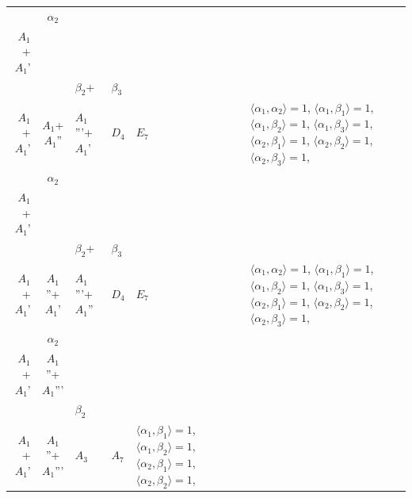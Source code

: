 \documentclass[12pt]{report}
\begin{document}
\begin{appendix}
{\begin{longtable}{rcl p{1cm}p{1cm}p{3cm} }
\\
\begin{tabular}{cc}$\alpha_1$+ & $\alpha_2$\\\tiny{ $A_1$+$A_1$' } & \tiny{  }\end{tabular} &\begin{tabular}{c} = \\~ \end{tabular} & \begin{tabular}{ccc}$\beta_1$+ & $\beta_2$+ & $\beta_3$\\\tiny{ $A_1$+$A_1$' } & \tiny{ $A_1$+$A_1$'' } & \tiny{ $A_1$'''+$A_1$' }\end{tabular} & $D_4$ & $E_7$ & $\langle\alpha_1, \alpha_2\rangle=1$,  $\langle\alpha_1, \beta_1\rangle=1$, $\langle\alpha_1, \beta_2\rangle=1$, $\langle\alpha_1, \beta_3\rangle=1$, $\langle\alpha_2, \beta_1\rangle=1$, $\langle\alpha_2, \beta_2\rangle=1$, $\langle\alpha_2, \beta_3\rangle=1$, 
\\
\begin{tabular}{cc}$\alpha_1$+ & $\alpha_2$\\\tiny{ $A_1$+$A_1$' } & \tiny{  }\end{tabular} &\begin{tabular}{c} = \\~ \end{tabular} & \begin{tabular}{ccc}$\beta_1$+ & $\beta_2$+ & $\beta_3$\\\tiny{ $A_1$+$A_1$' } & \tiny{ $A_1$''+$A_1$' } & \tiny{ $A_1$'''+$A_1$'' }\end{tabular} & $D_4$ & $E_7$ & $\langle\alpha_1, \alpha_2\rangle=1$,  $\langle\alpha_1, \beta_1\rangle=1$, $\langle\alpha_1, \beta_2\rangle=1$, $\langle\alpha_1, \beta_3\rangle=1$, $\langle\alpha_2, \beta_1\rangle=1$, $\langle\alpha_2, \beta_2\rangle=1$, $\langle\alpha_2, \beta_3\rangle=1$, 
\\
\begin{tabular}{cc}$\alpha_1$+ & $\alpha_2$\\\tiny{ $A_1$+$A_1$' } & \tiny{ $A_1$''+$A_1$''' }\end{tabular} &\begin{tabular}{c} = \\~ \end{tabular} & \begin{tabular}{cc}$\beta_1$+ & $\beta_2$\\\tiny{ $A_1$+$A_1$' } & \tiny{ $A_1$''+$A_1$''' }\end{tabular} & $A_3$ & $A_7$ &  $\langle\alpha_1, \beta_1\rangle=1$, $\langle\alpha_1, \beta_2\rangle=1$, $\langle\alpha_2, \beta_1\rangle=1$, $\langle\alpha_2, \beta_2\rangle=1$, 

\end{longtable}}
\end{appendix}
\end{document}
